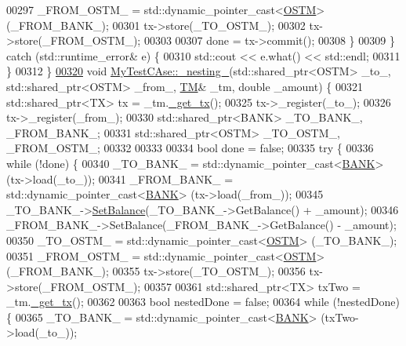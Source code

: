 \begin{DoxyCode}
00297             \_FROM\_OSTM\_ = std::dynamic\_pointer\_cast<\hyperlink{class_o_s_t_m}{OSTM}> (\_FROM\_BANK\_);
00301             tx->store(\_TO\_OSTM\_);
00302             tx->store(\_FROM\_OSTM\_);
00303 
00307             done = tx->commit();
00308         \}
00309     \} \textcolor{keywordflow}{catch} (std::runtime\_error& e) \{
00310         std::cout << e.what() << std::endl;
00311     \}
00312 \}
\hypertarget{_my_test_c_ase_8cpp_source.tex_l00320}{}\hyperlink{class_my_test_c_ase_abb973a1396c1083891d76845e2cfaf64_abb973a1396c1083891d76845e2cfaf64}{00320} \textcolor{keywordtype}{void} \hyperlink{class_my_test_c_ase_abb973a1396c1083891d76845e2cfaf64_abb973a1396c1083891d76845e2cfaf64}{MyTestCAse::\_nesting\_}(std::shared\_ptr<OSTM> \_to\_, std::shared\_ptr<OSTM> \_from\_, 
      \hyperlink{class_t_m}{TM}& \_tm, \textcolor{keywordtype}{double} \_amount) \{
00321     std::shared\_ptr<TX> tx = \_tm.\hyperlink{class_t_m_a41cb0226cc4080c931651b13f74a0075_a41cb0226cc4080c931651b13f74a0075}{\_get\_tx}();
00325     tx->\_register(\_to\_);
00326     tx->\_register(\_from\_);
00330     std::shared\_ptr<BANK> \_TO\_BANK\_, \_FROM\_BANK\_;
00331     std::shared\_ptr<OSTM> \_TO\_OSTM\_, \_FROM\_OSTM\_;
00332 
00333 
00334     \textcolor{keywordtype}{bool} done = \textcolor{keyword}{false};
00335     \textcolor{keywordflow}{try} \{
00336         \textcolor{keywordflow}{while} (!done) \{
00340             \_TO\_BANK\_ = std::dynamic\_pointer\_cast<\hyperlink{class_b_a_n_k}{BANK}> (tx->load(\_to\_));
00341             \_FROM\_BANK\_ = std::dynamic\_pointer\_cast<\hyperlink{class_b_a_n_k}{BANK}> (tx->load(\_from\_));
00345             \_TO\_BANK\_->\hyperlink{class_b_a_n_k_ae3e45b407bf8ec7175662442ea24b7c0_ae3e45b407bf8ec7175662442ea24b7c0}{SetBalance}(\_TO\_BANK\_->GetBalance() + \_amount);
00346             \_FROM\_BANK\_->SetBalance(\_FROM\_BANK\_->GetBalance() - \_amount);
00350             \_TO\_OSTM\_ = std::dynamic\_pointer\_cast<\hyperlink{class_o_s_t_m}{OSTM}> (\_TO\_BANK\_);
00351             \_FROM\_OSTM\_ = std::dynamic\_pointer\_cast<\hyperlink{class_o_s_t_m}{OSTM}> (\_FROM\_BANK\_);
00355             tx->store(\_TO\_OSTM\_);
00356             tx->store(\_FROM\_OSTM\_);
00357 
00361             std::shared\_ptr<TX> txTwo = \_tm.\hyperlink{class_t_m_a41cb0226cc4080c931651b13f74a0075_a41cb0226cc4080c931651b13f74a0075}{\_get\_tx}();
00362 
00363             \textcolor{keywordtype}{bool} nestedDone = \textcolor{keyword}{false};
00364             \textcolor{keywordflow}{while} (!nestedDone) \{
00365                 \_TO\_BANK\_ = std::dynamic\_pointer\_cast<\hyperlink{class_b_a_n_k}{BANK}> (txTwo->load(\_to\_));

\end{DoxyCode}
